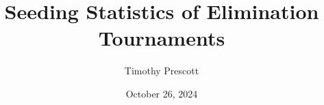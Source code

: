 \documentclass{beamer}
\title{Seeding Statistics of Elimination Tournaments}
\author{Timothy Prescott}
\date{October 26, 2024}
\begin{document}
\begin{frame}
\maketitle
\end{frame}

\end{document}
